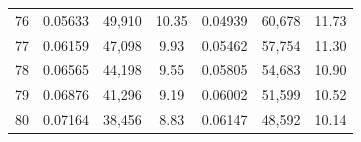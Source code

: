 \begin{tabular}{cccc|ccc}
76   & 0.05633                                                          & 49,910                                                                                            & 10.35                                                                                                                      & 0.04939                                                          & 60,678                                                                                            & 11.73                                                                                                                      \\
77   & 0.06159                                                          & 47,098                                                                                            & 9.93                                                                                                                       & 0.05462                                                          & 57,754                                                                                            & 11.30                                                                                                                      \\
78   & 0.06565                                                          & 44,198                                                                                            & 9.55                                                                                                                       & 0.05805                                                          & 54,683                                                                                            & 10.90                                                                                                                      \\
79   & 0.06876                                                          & 41,296                                                                                            & 9.19                                                                                                                       & 0.06002                                                          & 51,599                                                                                            & 10.52                                                                                                                      \\
80   & 0.07164                                                          & 38,456                                                                                            & 8.83                                                                                                                       & 0.06147                                                          & 48,592                                                                                            & 10.14                                                                                                                      \\

\end{tabular}
